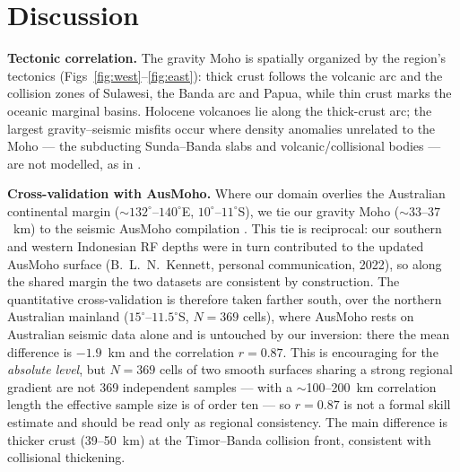 \documentclass[extra,mreferee]{gji}
\begin{document}
\section{Discussion}
\textbf{Tectonic correlation.} The gravity Moho is spatially organized by the
region's tectonics (Figs~\ref{fig:west}--\ref{fig:east}): thick crust follows the
volcanic arc and the collision zones of Sulawesi, the Banda arc and Papua, while
thin crust marks the oceanic marginal basins. Holocene volcanoes lie along the
thick-crust arc; the largest gravity--seismic misfits occur where density
anomalies unrelated to the Moho --- the subducting Sunda--Banda slabs and
volcanic/collisional bodies --- are not modelled, as in \citet{uieda2017}.

\textbf{Cross-validation with {AusMoho}.} Where our domain overlies the Australian
continental margin ($\sim132^{\circ}$--$140^{\circ}$E, $10^{\circ}$--$11^{\circ}$S),
we tie our gravity Moho
($\sim33$--$37$~km) to the seismic {AusMoho} compilation \citep{kennett2011}. This
tie is reciprocal: our southern and western Indonesian RF depths \citep{fauzi2021}
were in turn contributed to the updated {AusMoho} surface (B.~L.~N.~Kennett,
personal communication, 2022), so along the shared margin the two datasets are
consistent by construction. The quantitative cross-validation is therefore taken
farther south, over the northern Australian mainland
($15^{\circ}$--$11.5^{\circ}$S, $N=369$ cells), where {AusMoho} rests on Australian
seismic data alone and is untouched by our inversion: there the mean difference is
$-1.9$~km and the correlation $r=0.87$. This is encouraging for the \emph{absolute
level}, but $N=369$ cells of two smooth surfaces sharing a strong regional gradient
are not 369 independent samples --- with a $\sim$100--200~km correlation length the
effective sample size is of order ten --- so $r=0.87$ is not a formal skill estimate
and should be read only as regional consistency. The main difference is thicker crust
(39--50~km) at the Timor--Banda collision front, consistent with collisional
thickening.
\end{document}
